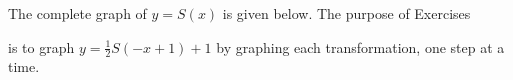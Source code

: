 {\noindent The complete graph of $y = S(x)$ is given below. The purpose of Exercises}
{ is to graph $y = \frac{1}{2}S(-x+1) + 1$ by graphing each transformation, one step at a time.

\begin{center}
\end{center}
}
